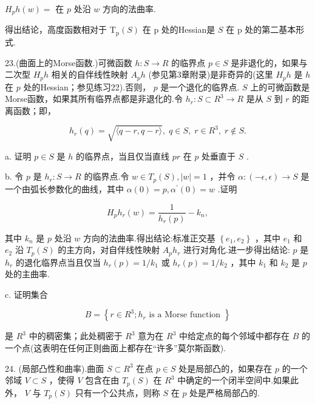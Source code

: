 \({H}_{p}h\left( w\right)  =\) 在 \(p\) 处沿 \(w\) 方向的法曲率.

得出结论，高度函数相对于 \({\mathrm{T}}_{\mathrm{p}}\left( S\right)\) 在 \(\mathrm{p}\) 处的Hessian是 \(S\) 在 \(\mathrm{p}\) 处的第二基本形式.

23.(曲面上的Morse函数.)可微函数 \(h : S \rightarrow  R\) 的临界点 \(p \in  S\) 是非退化的，如果与二次型 \({H}_{p}h\) 相关的自伴线性映射 \({A}_{p}h\) (参见第3章附录)是非奇异的(这里 \({H}_{p}h\) 是 \(h\) 在 \(p\) 处的Hessian；参见练习22).否则， \(p\) 是一个退化的临界点. \(S\) 上的可微函数是Morse函数，如果其所有临界点都是非退化的.令 \({h}_{r} : S \subset  {R}^{3} \rightarrow  R\) 是从 \(S\) 到 \(r\) 的距离函数；即，

\[
{h}_{r}\left( q\right)  = \sqrt{\langle q - r,q - r\rangle },\;q \in  S,\;r \in  {R}^{3},\;r \notin  S.
\]

a. 证明 \(p \in  S\) 是 \(h\) 的临界点，当且仅当直线 \({pr}\) 在 \(p\) 处垂直于 \(S\) .

b. 令 \(p\) 是 \({h}_{r} : S \rightarrow  R\) 的临界点.令 \(w \in  {T}_{p}\left( S\right) ,\left| w\right|  = 1\) ，并令 \(\alpha  : \left( {-\epsilon ,\epsilon }\right)  \rightarrow  S\) 是一个由弧长参数化的曲线，其中 \(\alpha \left( 0\right)  = p,{\alpha }^{\prime }\left( 0\right)  = w\) .证明

\[
{H}_{p}{h}_{r}\left( w\right)  = \frac{1}{{h}_{r}\left( p\right) } - {k}_{n},
\]

其中 \({k}_{n}\) 是 \(p\) 处沿 \(w\) 方向的法曲率.得出结论:标准正交基 \(\left\{  {{e}_{1},{e}_{2}}\right\}\) ，其中 \({e}_{1}\) 和 \({e}_{2}\) 沿 \({T}_{p}\left( S\right)\) 的主方向，对自伴线性映射 \({A}_{p}{h}_{r}\) 进行对角化.进一步得出结论: \(p\) 是 \({h}_{r}\) 的退化临界点当且仅当 \({h}_{r}\left( p\right)  = 1/{k}_{1}\) 或 \({h}_{r}\left( p\right)  = 1/{k}_{2}\) ，其中 \({k}_{1}\) 和 \({k}_{2}\) 是 \(p\) 处的主曲率.

c. 证明集合

\[
B = \left\{  {r \in  {R}^{3};{h}_{r}\text{ is a Morse function }}\right\}
\]

是 \({R}^{3}\) 中的稠密集；此处稠密于 \({R}^{3}\) 意为在 \({R}^{3}\) 中给定点的每个邻域中都存在 \(B\) 的一个点(这表明在任何正则曲面上都存在“许多”莫尔斯函数).

24. (局部凸性和曲率).曲面 \(S \subset  {R}^{3}\) 在点 \(p \in  S\) 处是局部凸的，如果存在 \(p\) 的一个邻域 \(V \subset  S\) ，使得 \(V\) 包含在由 \({T}_{p}\left( S\right)\) 在 \({R}^{3}\) 中确定的一个闭半空间中.如果此外， \(V\) 与 \({T}_{p}\left( S\right)\) 只有一个公共点，则称 \(S\) 在 \(p\) 处是严格局部凸的.

